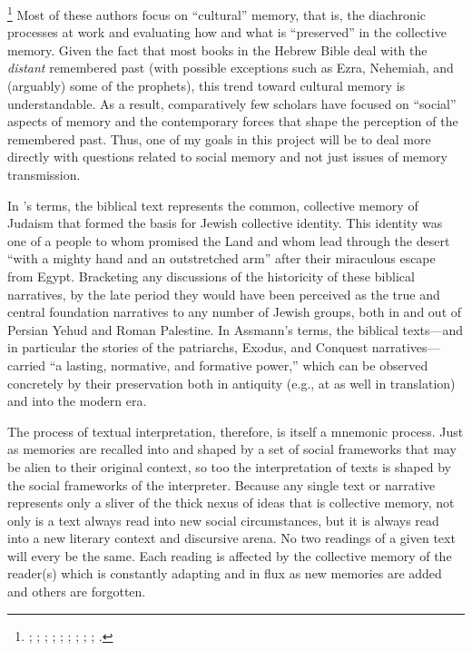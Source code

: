     \footnote{%
        \Cite{benzvi_st2017};
        \cite{benzvi_bautch-knoppers2015};
        \cite{benzvi_edelman-benzvi2013};
        \cite{hendel2005};
        \cite{hendel_jbl2001};
        \cite{wilson2017};
        \cite{pioske2018};
        \cite{pioske_bibint2015};
        \cite{pioske2015};
        \cite{smith_cbq2002}.}
Most of these authors focus on ``cultural'' memory, that is, the diachronic processes at work and evaluating how and what is ``preserved'' in the collective memory. Given the fact that most books in the Hebrew Bible deal with the \emph{distant} remembered past (with possible exceptions such as Ezra, Nehemiah, and (arguably) some of the prophets), this trend toward cultural memory is understandable. As a result, comparatively few scholars have focused on ``social'' aspects of memory and the contemporary forces that shape the perception of the remembered past. Thus, one of my goals in this project will be to deal more directly with questions related to social memory and not just issues of memory transmission.

In \halbwachs's terms, the biblical text represents the common, collective memory of \secondtemple Judaism that formed the basis for Jewish collective identity. This identity was one of a people to whom \yahweh promised the Land and whom \yahweh lead through the desert ``with a mighty hand and an outstretched arm'' after their miraculous escape from Egypt. Bracketing any discussions of the historicity of these biblical narratives, by the late \secondtemple period they would have been perceived as the true and central foundation narratives to any number of Jewish groups, both in and out of Persian Yehud and Roman Palestine. In Assmann's terms, the biblical texts---and in particular the stories of the patriarchs, Exodus, and Conquest narratives---carried ``a lasting, normative, and formative power,''%
    \autocite[38]{assmann2011}
which can be observed concretely by their preservation both in antiquity (e.g., at \qumran as well in translation) and into the modern era.  

The process of textual interpretation, therefore, is itself a mnemonic process. Just as memories are recalled into and shaped by a set of social frameworks that may be alien to their original context, so too the interpretation of texts is shaped by the social frameworks of the interpreter. Because any single text or narrative represents only a sliver of the thick nexus of ideas that is collective memory, not only is a text always read into new social circumstances, but it is always read into a new literary context and discursive arena. No two readings of a given text will every be the same. Each reading is affected by the collective memory of the reader(s) which is constantly adapting and in flux as new memories are added and others are forgotten.  

